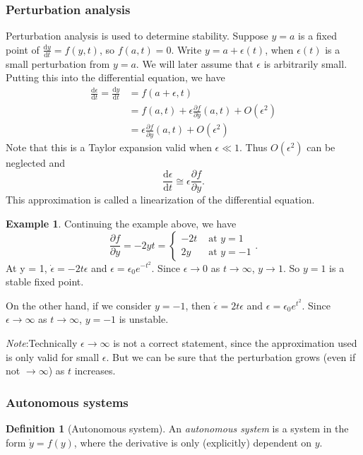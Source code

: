 \documentclass[a4paper]{article}
\theoremstyle{definition}
\newtheorem*{defi}{Definition}
\newtheorem*{eg}{Example}
\newcommand{\note}{\noindent \emph{Note}:\;}
\renewcommand{\d}{\mathrm{d}}
\begin{document}
\subsubsection{Perturbation analysis}
Perturbation analysis is used to determine stability. Suppose $y = a$ is a fixed point of $\frac{\d y}{\d t} = f(y, t)$, so $f(a, t) = 0$. Write $y = a + \epsilon(t)$, when $\epsilon(t)$ is a small perturbation from $y = a$. We will later assume that $\epsilon$ is arbitrarily small. Putting this into the differential equation, we have
\begin{align*}
  \frac{\d \epsilon}{\d t} = \frac{\d y}{\d t} &= f(a + \epsilon, t)\\
  &= f(a, t) + \epsilon\frac{\partial f}{\partial y}(a, t) + O(\epsilon^2)\\
  &= \epsilon\frac{\partial f}{\partial y}(a, t) + O(\epsilon^2)
\end{align*}
Note that this is a Taylor expansion valid when $\epsilon \ll 1$. Thus $O(\epsilon^2)$ can be neglected and
\[
\frac{\d \epsilon}{\d t} \cong \epsilon\frac{\partial f}{\partial y}.
\]
This approximation is called a linearization of the differential equation.
\begin{eg}
  Continuing the example above, we have
  \[
  \frac{\partial f}{\partial y} = -2yt =
  \begin{cases}
    -2t & \text{ at } y = 1\\
    2y & \text{ at } y = -1
  \end{cases}.
  \]
  At y = 1, $\dot{\epsilon} = -2t\epsilon$ and $\epsilon = \epsilon_0 e^{-t^2}$. Since $\epsilon \to 0$ as $t \to \infty$, $y \to 1$. So $y = 1$ is a stable fixed point.

  On the other hand, if we consider $y = -1$, then $\dot\epsilon = 2t\epsilon$ and $\epsilon = \epsilon_0 e^{t^2}$. Since $\epsilon \to \infty$ as $t\to \infty$, $y = -1$ is unstable.

\note Technically $\epsilon \to \infty$ is not a correct statement, since the approximation used is only valid for small $\epsilon$. But we can be sure that the perturbation grows (even if not $\to \infty$) as $t$ increases.
\end{eg}

\subsubsection{Autonomous systems}
\begin{defi}[Autonomous system]
  An \emph{autonomous system} is a system in the form $\dot y = f(y)$, where the derivative is only (explicitly) dependent on $y$.
\end{defi}
\end{document}
